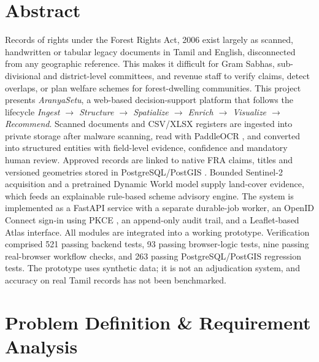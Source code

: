 \documentclass[11pt, a4paper]{article}
\begin{document}
\section{Abstract}
\noindent
Records of rights under the Forest Rights Act, 2006 \cite{fra2006} exist largely as scanned, handwritten or tabular legacy documents in Tamil and English, disconnected from any geographic reference. This makes it difficult for Gram Sabhas, sub-divisional and district-level committees, and revenue staff to verify claims, detect overlaps, or plan welfare schemes for forest-dwelling communities. This project presents \textit{AranyaSetu}, a web-based decision-support platform that follows the lifecycle \textit{Ingest $\rightarrow$ Structure $\rightarrow$ Spatialize $\rightarrow$ Enrich $\rightarrow$ Visualize $\rightarrow$ Recommend}. Scanned documents and CSV/XLSX registers are ingested into private storage after malware scanning, read with PaddleOCR \cite{du2020ppocr}, and converted into structured entities with field-level evidence, confidence and mandatory human review. Approved records are linked to native FRA claims, titles and versioned geometries stored in PostgreSQL/PostGIS \cite{postgis}. Bounded Sentinel-2 \cite{drusch2012sentinel2} acquisition and a pretrained Dynamic World \cite{brown2022dynamic} model supply land-cover evidence, which feeds an explainable rule-based scheme advisory engine. The system is implemented as a FastAPI \cite{fastapi} service with a separate durable-job worker, an OpenID Connect sign-in using PKCE \cite{rfc7636,oidccore}, an append-only audit trail, and a Leaflet-based Atlas interface. All modules are integrated into a working prototype. Verification comprised 521 passing backend tests, 93 passing browser-logic tests, nine passing real-browser workflow checks, and 263 passing PostgreSQL/PostGIS regression tests. The prototype uses synthetic data; it is not an adjudication system, and accuracy on real Tamil records has not been benchmarked.

\section{Problem Definition \& Requirement Analysis}
\end{document}

